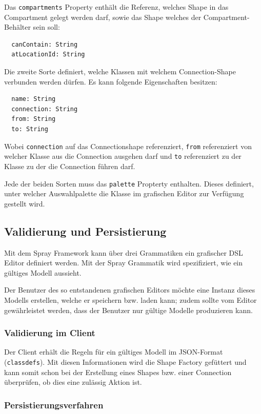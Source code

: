 \noindent Das {\tt compartments} Property enthält die Referenz,
welches Shape in das Compartment gelegt werden darf, sowie das
Shape welches der Compartment-Behälter sein soll:

\begin{verbatim}
  canContain: String
  atLocationId: String
\end{verbatim}

\noindent Die zweite Sorte definiert, welche Klassen mit welchem
Connection-Shape verbunden werden dürfen. Es kann folgende Eigenschaften
besitzen:

\begin{verbatim}
  name: String
  connection: String
  from: String
  to: String
\end{verbatim}

\noindent Wobei {\tt connection} auf das Connectionshape referenziert,
{\tt from} referenziert von welcher Klasse aus die Connection ausgehen darf
und {\tt to} referenziert zu der Klasse zu der die Connection führen darf.

Jede der beiden Sorten muss das {\tt palette} Propterty enthalten.
Dieses definiert, unter welcher Auswahlpalette die Klasse im grafischen Editor
zur Verfügung gestellt wird.

\subsection{Validierung und Persistierung}

Mit dem Spray Framework kann über drei Grammatiken ein grafischer DSL
Editor definiert werden. Mit der Spray Grammatik wird spezifiziert,
wie ein gültiges Modell aussieht.

Der Benutzer des so entstandenen grafischen Editors möchte eine Instanz
dieses Modells erstellen, welche er speichern bzw. laden kann;
zudem sollte vom Editor gewährleistet werden, dass der Benutzer nur
gültige Modelle produzieren kann.

\subsubsection{Validierung im Client}

Der Client erhält die Regeln für ein gültiges Modell im JSON-Format
({\tt classdefs}). Mit diesen Informationen wird die Shape Factory gefüttert
und kann somit schon bei der Erstellung eines Shapes bzw. einer Connection
überprüfen, ob dies eine zulässig Aktion ist.

\subsubsection{Persistierungsverfahren}

